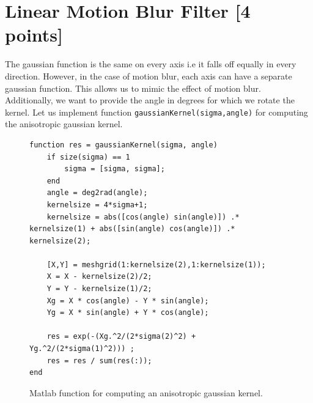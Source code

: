 \documentclass[tikz,14pt,fleqn]{article}
\begin{document}
\section{Linear Motion Blur Filter [4 points]}
The gaussian function is the same on every axis i.e it falls off equally in every direction. However, in the case of motion blur, each axis can have a separate gaussian function. This allows us to mimic the effect of motion blur.\\
Additionally, we want to provide the angle in degrees for which we rotate the kernel. Let us implement function \texttt{gaussianKernel(sigma,angle)} for computing the anisotropic gaussian kernel.
\begin{figure}[h!]
\begin{verbatim} 
function res = gaussianKernel(sigma, angle)
    if size(sigma) == 1
        sigma = [sigma, sigma];
    end
    angle = deg2rad(angle);
    kernelsize = 4*sigma+1;
    kernelsize = abs([cos(angle) sin(angle)]) .* kernelsize(1) + abs([sin(angle) cos(angle)]) .* kernelsize(2);

    [X,Y] = meshgrid(1:kernelsize(2),1:kernelsize(1));
    X = X - kernelsize(2)/2; 
    Y = Y - kernelsize(1)/2;
    Xg = X * cos(angle) - Y * sin(angle);
    Yg = X * sin(angle) + Y * cos(angle);

    res = exp(-(Xg.^2/(2*sigma(2)^2) + Yg.^2/(2*sigma(1)^2))) ;
    res = res / sum(res(:));
end
\end{verbatim}
\caption{Matlab function for computing an anisotropic gaussian kernel.}
\end{figure}
\end{document}

